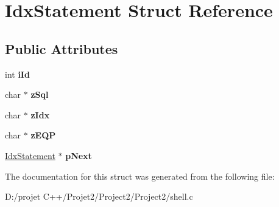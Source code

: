 \hypertarget{struct_idx_statement}{}\section{Idx\+Statement Struct Reference}
\label{struct_idx_statement}
\subsection*{Public Attributes}
\begin{DoxyCompactItemize}
\item 
\mbox{\label{struct_idx_statement_af5aebee6d10916b241551cd781f7d264}} 
int {\bfseries i\+Id}
\item 
\mbox{\label{struct_idx_statement_a748aa468d985e53623c93ae12a17bbee}} 
char $\ast$ {\bfseries z\+Sql}
\item 
\mbox{\label{struct_idx_statement_a02fad3aea42e1b98fc4812742ee7fc0b}} 
char $\ast$ {\bfseries z\+Idx}
\item 
\mbox{\label{struct_idx_statement_ad0698830e4a6d9a12f8ed2b653fbeaea}} 
char $\ast$ {\bfseries z\+E\+QP}
\item 
\mbox{\label{struct_idx_statement_a176b6762d7b90a71cbd34ca77f294d46}} 
\mbox{\hyperlink{struct_idx_statement}{Idx\+Statement}} $\ast$ {\bfseries p\+Next}
\end{DoxyCompactItemize}


The documentation for this struct was generated from the following file\+:\begin{DoxyCompactItemize}
\item 
D\+:/projet C++/\+Projet2/\+Project2/\+Project2/shell.\+c\end{DoxyCompactItemize}
